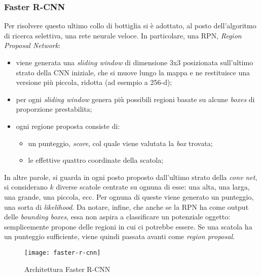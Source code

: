 \subsubsection*{Faster R-CNN}
Per risolvere questo ultimo collo di bottiglia si è adottato, al posto dell'algoritmo di ricerca selettiva, una rete neurale veloce. In particolare, una RPN, \textit{Region Proposal Network}:
\begin{itemize}
	\item viene generata una \textit{sliding window} di dimensione 3x3 posizionata sull'ultimo strato della CNN iniziale, che si muove lungo la mappa e ne restituisce una versione più piccola, ridotta (ad esempio a 256-d);
	\item per ogni \textit{sliding window} genera più possibili regioni basate su alcune \textit{boxes} di proporzione prestabilita;
	\item ogni regione proposta consiste di:
	\begin{itemize}
		\item un punteggio, \textit{score}, col quale viene valutata la \textit{box} trovata;
		\item le effettive quattro coordinate della scatola;
	\end{itemize}
\end{itemize}
In altre parole, si guarda in ogni posto proposto dall'ultimo strato della \textit{conv net}, si considerano $k$ diverse scatole centrate su ognuna di esse: una alta, una larga, una grande, una piccola, ecc. Per ognuna di queste viene generato un punteggio, una sorta di \textit{likelihood}. 
Da notare, infine, che anche se la RPN ha come output delle \textit{bounding boxes}, essa non aspira a classificare un potenziale oggetto: semplicemente propone delle regioni in cui ci potrebbe essere. Se una scatola ha un punteggio sufficiente, viene quindi passata avanti come \textit{region proposal}.
\begin{figure}[!ht] 
	\centering
	\texttt{[image: faster-r-cnn]} 
	\caption{Architettura Faster R-CNN}
	\label{img:faster-r-cnn_architecture}
\end{figure}

